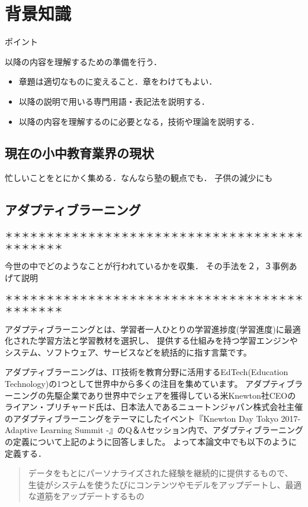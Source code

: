 \documentclass[a4j,11pt,report]{jsbook}
\newcommand{\point}[1]{
\begin{itembox}[l]{ポイント}
  #1
\end{itembox}
}
\begin{document}
\chapter{背景知識\label{ch:background}}

\point{
以降の内容を理解するための準備を行う．
\begin{itemize}
  \item 章題は適切なものに変えること．章をわけてもよい．
  \item 以降の説明で用いる専門用語・表記法を説明する．
  \item 以降の内容を理解するのに必要となる，技術や理論を説明する．
\end{itemize}
}
\section{現在の小中教育業界の現状}
忙しいことをとにかく集める．なんなら塾の観点でも．
子供の減少にも

\section{アダプティブラーニング}

＊＊＊＊＊＊＊＊＊＊＊＊＊＊＊＊＊＊＊＊＊＊＊＊＊＊＊＊＊＊＊＊＊＊＊＊＊＊＊＊＊＊＊

今世の中でどのようなことが行われているかを収集．
その手法を２，３事例あげて説明

＊＊＊＊＊＊＊＊＊＊＊＊＊＊＊＊＊＊＊＊＊＊＊＊＊＊＊＊＊＊＊＊＊＊＊＊＊＊＊＊＊＊＊

アダプティブラーニングとは、学習者一人ひとりの学習進捗度(学習進度)に最適化された学習方法と学習教材を選択し、
提供する仕組みを持つ学習エンジンやシステム、ソフトウェア、サービスなどを統括的に指す言葉です。

アダプティブラーニングは、IT技術を教育分野に活用するEdTech(Education Technology)の1つとして世界中から多くの注目を集めています。
アダプティブラーニングの先駆企業であり世界中でシェアを獲得している米Knewton社CEOのライアン・プリチャード氏は、日本法人であるニュートンジャパン株式会社主催のアダプティブラーニングをテーマにしたイベント『Knewton Day Tokyo 2017- Adaptive Learning Summit -』のQ＆Aセッション内で、アダプティブラーニングの定義について上記のように回答しました。
よって本論文中でも以下のように定義する．
\begin{quote}
  データをもとにパーソナライズされた経験を継続的に提供するもので、
  生徒がシステムを使うたびにコンテンツやモデルをアップデートし、最適な道筋をアップデートするもの
\end{quote}
\end{document}
